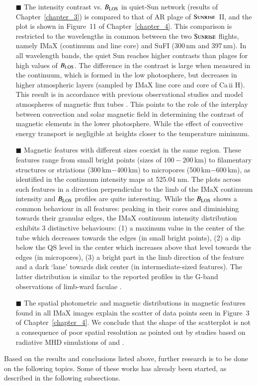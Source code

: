 \documentclass[goettingen, gauss, print]{thesis}
\begin{document}
\begin{itemize}
\item[$\blacksquare$] The intensity contrast vs. $B_{\rm LOS}$ in quiet-Sun network (results of Chapter~\ref{chapter_3}) is compared to that of AR plage of $\textsc{Sunrise}$~II, and the plot is shown in Figure~11 of Chapter~\ref{chapter_4}. This comparison is restricted to the wavelengths in common between the two $\textsc{Sunrise}$ flights, namely IMaX (continuum and line core) and SuFI (300\,nm and 397\,nm). In all wavelength bands, the quiet Sun reaches higher contrasts than plages for high values of $B_{\rm LOS}$. The difference in the contrast is large when measured in the continuum, which is formed in the low photosphere, but decreases in higher atmospheric layers (sampled by IMaX line core and core of Ca\,{\sc ii} H). This result is in accordance with previous observational studies \citep{title_differences_1992, kobel_continuum_2011} and model atmospheres of magnetic flux tubes \citep{solanki_photospheric_1987, solanki_continuum_1992}. This points to the role of the interplay between convection and solar magnetic field in determining the contrast of magnetic elements in the lower photosphere. While the effect of convective energy transport is negligible at heights closer to the temperature minimum.


\item[$\blacksquare$] Magnetic features with different sizes coexist in the same region. These features range from small bright points (sizes of $100-200$\,km) to filamentary structures or striations (300\,km$-$400\,km) to micropores (500\,km$-$600\,km), as identified in the continuum intensity maps at 525.04 nm. The plots across such features in a direction perpendicular to the limb of the IMaX continuum intensity and $B_{\rm LOS}$ profiles are quite interesting. While the $B_{\rm LOS}$ shows a common behaviour in all features: peaking in their cores and diminishing towards their granular edges, the IMaX continuum intensity distribution exhibits 3 distinctive behaviours: (1) a maximum value in the center of the tube which decreases towards the edges (in small bright points), (2) a dip below the QS level in the center which increases above that level towards the edges (in micropores), (3) a bright part in the limb direction of the feature and a dark `lane' towards disk center (in intermediate-sized features). The latter distribution is similar to the reported profiles in the G-band observations of limb-ward faculae \citep{hirzberger_solar_2005}. 
  
\item[$\blacksquare$] The spatial photometric and magnetic distributions in magnetic features found in all IMaX images explain the scatter of data points seen in Figure~3 of Chapter~\ref{chapter_4}. We conclude that the shape of the scatterplot is not a consequence of poor spatial resolution as pointed out by studies based on radiative MHD simulations of \cite{rohrbein_is_2011} and \cite{danilovic_relation_2013}.
\end{itemize}
Based on the results and conclusions listed above, further research is to be done on the following topics. Some of these works has already been started, as described in the following subsections.
\end{document}
